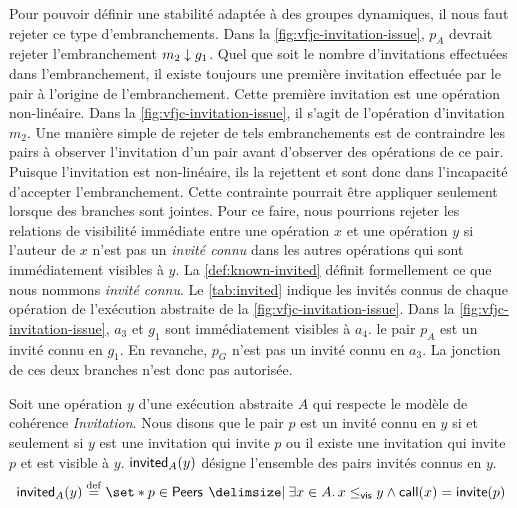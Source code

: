 Pour pouvoir définir une stabilité adaptée à des groupes dynamiques, il nous faut rejeter ce type d'embranchements.
Dans la \autoref{fig:vfjc-invitation-issue}, $p_A$ devrait rejeter l'embranchement $m_2 \downarrow g_1$.
Quel que soit le nombre d'invitations effectuées dans l'embranchement, il existe toujours une première invitation effectuée par le pair à l'origine de l'embranchement.
Cette première invitation est une opération non-linéaire.
Dans la \autoref{fig:vfjc-invitation-issue}, il s'agit de l'opération d'invitation $m_2$.
Une manière simple de rejeter de tels embranchements est de contraindre les pairs à observer l'invitation d'un pair avant d'observer des opérations de ce pair.
Puisque l'invitation est non-linéaire, ils la rejettent et sont donc dans l'incapacité d'accepter l'embranchement.
Cette contrainte pourrait être appliquer seulement lorsque des branches sont jointes.
Pour ce faire, nous pourrions rejeter les relations de visibilité immédiate entre une opération $x$ et une opération $y$ si l'auteur de $x$ n'est pas un \emph{invité connu} dans les autres opérations qui sont immédiatement visibles à $y$.
La \autoref{def:known-invited} définit formellement ce que nous nommons \emph{invité connu}.
Le \autoref{tab:invited} indique les invités connus de chaque opération de l'exécution abstraite de la \autoref{fig:vfjc-invitation-issue}.
Dans la \autoref{fig:vfjc-invitation-issue}, $a_3$ et $g_1$ sont immédiatement visibles à $a_4$.
le pair $p_A$ est un invité connu en $g_1$.
En revanche, $p_G$ n'est pas un invité connu en $a_3$.
La jonction de ces deux branches n'est donc pas autorisée.

\begin{definition}\label{def:known-invited}
Soit une opération $y$ d'une exécution abstraite $A$ qui respecte le modèle de cohérence \emph{Invitation}.
Nous disons que le pair $p$ est un invité connu en $y$ si et seulement si $y$ est une invitation qui invite $p$ ou il existe une invitation qui invite $p$ et est visible à $y$.
$\operatorname{\mathsf{invited}}_A(y)$ désigne l'ensemble des pairs invités connus en $y$.
\begin{equation*}
    \trm{invited}_A(y) \defeq \set*{p \in \trm{Peers} \given \exists x \in A \qsep x \viseq y \land \trm{call}(x) = \trm{invite}(p)}
\end{equation*}
\end{definition}


